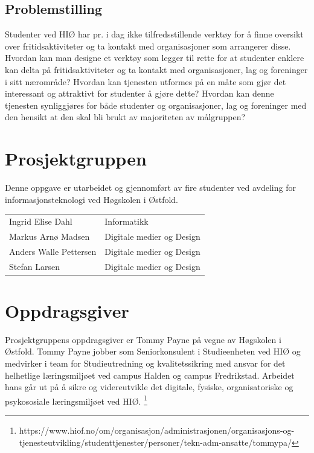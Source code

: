 \subsection{Problemstilling}
Studenter ved HIØ har pr. i dag ikke tilfredsstillende verktøy for å finne oversikt over fritidsaktiviteter og ta kontakt med organisasjoner som arrangerer disse. Hvordan kan man designe et verktøy som legger til rette for at studenter enklere kan delta på fritidsaktiviteter og ta kontakt med organisasjoner, lag og foreninger i sitt nærområde? Hvordan kan tjenesten utformes på en måte som gjør det interessant og attraktivt for studenter å gjøre dette? Hvordan kan denne tjenesten synliggjøres for både studenter og organisasjoner, lag og foreninger med den hensikt at den skal bli brukt av majoriteten av målgruppen?

\section{Prosjektgruppen}
Denne oppgave er utarbeidet og gjennomført av fire studenter ved avdeling for informasjonsteknologi ved Høgskolen i Østfold.

\begin{center}
\begin{tabular}{ l l }
 Ingrid Elise Dahl & Informatikk \\ 
 Markus Arnø Madsen & Digitale medier og Design \\  
 Anders Walle Pettersen & Digitale medier og Design \\
 Stefan Larsen & Digitale medier og Design \\
\end{tabular}
\end{center}

\section{Oppdragsgiver}
Prosjektgruppens oppdragsgiver er Tommy Payne på vegne av Høgskolen i Østfold. Tommy Payne jobber som Seniorkonsulent i Studieenheten ved HIØ og medvirker i team for Studieutredning og kvalitetssikring med ansvar for det helhetlige læringsmiljøet ved campus Halden og campus Fredrikstad. Arbeidet hans går ut på å sikre og videreutvikle det digitale, fysiske, organisatoriske og psykososiale læringsmiljøet ved HIØ. \footnote{https://www.hiof.no/om/organisasjon/administrasjonen/organisasjons-og-tjenesteutvikling/studenttjenester/personer/tekn-adm-ansatte/tommypa/}

